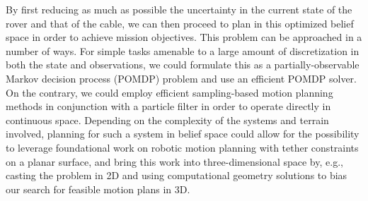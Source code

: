 \documentclass[12pt]{article}
\begin{document}
By first reducing as much as possible the uncertainty in the current state of the rover and that of the cable, we can then proceed to plan in this optimized belief space in order to achieve mission objectives. This problem can be approached in a number of ways. For simple tasks amenable to a large amount of discretization in both the state and observations, we could formulate this as a partially-observable Markov decision process (POMDP) problem and use an efficient POMDP solver. On the contrary, we could employ efficient sampling-based motion planning methods in conjunction with a particle filter in order to operate directly in continuous space. Depending on the complexity of the systems and terrain involved, planning for such a system in belief space could allow for the possibility to leverage foundational work on robotic motion planning with tether constraints on a planar surface, and bring this work into three-dimensional space by, e.g., casting the problem in 2D and using computational geometry solutions to bias our search for feasible motion plans in 3D. 










\end{document}
